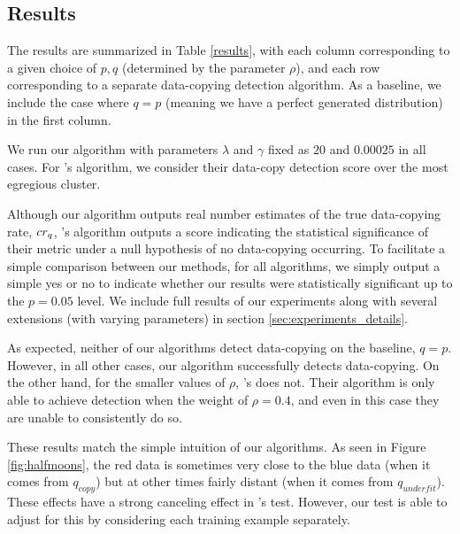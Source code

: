 \subsection{Results}

The results are summarized in Table \ref{results}, with each column corresponding to a given choice of $p, q$ (determined by the parameter $\rho$), and each row corresponding to a separate data-copying detection algorithm. As a baseline, we include the case where $q = p$ (meaning we have a perfect generated distribution) in the first column.

We run our algorithm with parameters $\lambda$ and $\gamma$ fixed as $20$ and $0.00025$ in all cases. For \cite{MCD2020}'s algorithm, we consider their data-copy detection score over the most egregious cluster. 

Although our algorithm outputs real number estimates of the true data-copying rate, $cr_q$, \cite{MCD2020}'s algorithm outputs a score indicating the statistical significance of their metric under a null hypothesis of no data-copying occurring. To facilitate a simple comparison between our methods, for all algorithms, we simply output a simple yes or no to indicate whether our results were statistically significant up to the $p=0.05$ level. We include full results of our experiments along with several extensions (with varying parameters) in section \ref{sec:experiments_details}.

As expected, neither of our algorithms detect data-copying on the baseline, $q = p$. However, in all other cases, our algorithm successfully detects data-copying. On the other hand, for the smaller values of $\rho$, \cite{MCD2020}'s does not. Their algorithm is only able to achieve detection when the weight of $\rho = 0.4$, and even in this case they are unable to consistently do so.  

These results match the simple intuition of our algorithms. As seen in Figure \ref{fig:halfmoons}, the red data is sometimes very close to the blue data (when it comes from $q_{copy}$) but at other times fairly distant (when it comes from $q_{underfit}$). These effects have a strong canceling effect in \cite{MCD2020}'s test. However, our test is able to adjust for this by considering each training example separately. 



